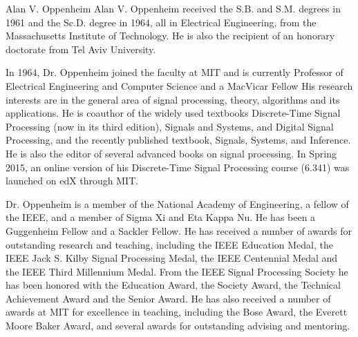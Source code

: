 \documentclass[journal] {IEEEtran}
\begin{document}
\begin{IEEEbiography}{Alan V. Oppenheim}
Alan V. Oppenheim received the S.B. and S.M. degrees in 1961 and the Sc.D. degree in 1964, all in Electrical Engineering, from the Massachusetts Institute of Technology.  He is also the recipient of an honorary doctorate from Tel Aviv University.  

In 1964, Dr. Oppenheim joined the faculty at MIT and is currently Professor of Electrical Engineering and Computer Science and a MacVicar Fellow His research interests are in the general area of signal processing, theory, algorithms and its applications.  He is coauthor of the widely used textbooks Discrete-Time Signal Processing (now in its third edition), Signals and Systems, and Digital Signal Processing, and the recently published textbook, Signals, Systems, and Inference.  He is also the editor of several advanced books on signal processing. In Spring 2015, an online version of his Discrete-Time Signal Processing course (6.341) was launched on edX through MIT.

Dr. Oppenheim is a member of the National Academy of Engineering, a fellow of the IEEE, and a member of Sigma Xi and Eta Kappa Nu.  He has been a Guggenheim Fellow and a Sackler Fellow.  He has received a number of awards for outstanding research and teaching, including the IEEE Education Medal, the IEEE Jack S. Kilby Signal Processing Medal, the IEEE Centennial Medal and the IEEE Third Millennium Medal. From the IEEE Signal Processing Society he has been honored with the Education Award, the Society Award, the Technical Achievement Award and the Senior Award. He has also received a number of awards at MIT for excellence in teaching, including the Bose Award, the Everett Moore Baker Award, and several awards for outstanding advising and mentoring.
\end{IEEEbiography}
\end{document}
